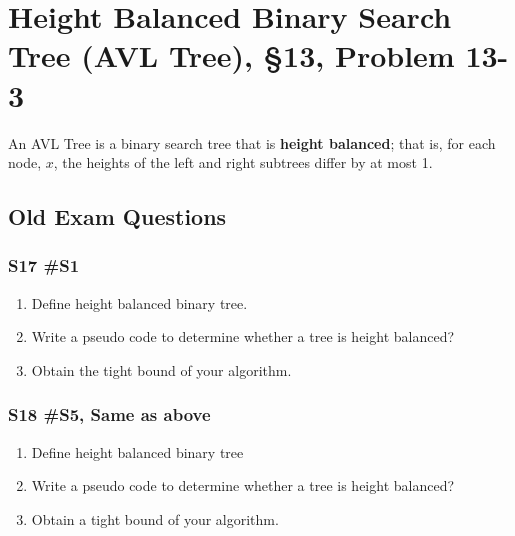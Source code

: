 \section{Height Balanced Binary Search Tree (AVL Tree), \S 13, Problem 13-3}


An AVL Tree is a binary search tree that is {\bf height balanced}; that is, for each node, $x$, the heights of the left and right subtrees differ by at most 1.  

\subsection{Old Exam Questions}
\subsubsection{S17 \#S1}
	 \begin{enumerate}[label=\alph*.]
		\item Define height balanced binary tree.
		\item Write a pseudo code to determine whether a tree is height balanced?
		\item Obtain the tight bound of your algorithm.
	\end{enumerate}



\subsubsection{S18 \#S5, Same as above}
	\begin{enumerate}[label=\alph*.]
		\item Define height balanced binary tree
		\item Write a pseudo code to determine whether a tree is height balanced?
		\item Obtain a tight bound of your algorithm.
	\end{enumerate}


